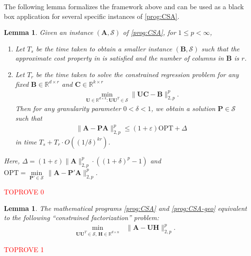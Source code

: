 \documentclass[11pt]{article}
\makeatletter
\theoremstyle{plain}
\newtheorem{lemma}[theorem]{Lemma}
\theoremstyle{plain}
\theoremstyle{definition}
\theoremstyle{plain}
\theoremstyle{remark}
\newenvironment{proof}[1][\protect\proofname]{\par
	\normalfont\topsep6\p@\@plus6\p@\relax
	\trivlist
	\itemindent\parindent
	\item[\hskip\labelsep\scshape #1]\ignorespaces
}{\endtrivlist\@endpefalse
}
\providecommand{\proofname}{Proof}
\newcommand{\RR}{\mathbb{R}}
\newcommand{\cS}{\mathcal{S}}
\newcommand{\opt}{\ensuremath{\text{OPT}}\xspace}
\makeatother
\begin{document}
The following lemma formalizes the framework above and can be used as a black box application for several specific instances of \ref{prog:CSA}.
\begin{lemma}
\label{lem:structural-CSA}
Given an instance $(\bm{A}, \cS)$ of \ref{prog:CSA}, for $1\leq p<\infty$,
\begin{enumerate}
    \item Let $T_s$ be the time taken to obtain a smaller instance $(\bm{B}, \cS)$ such that the approximate cost property in  is satisfied and the number of columns in $\bm{B}$ is $r$.
    \item Let $T_r$ be the time taken to solve the constrained regression problem for any fixed $\bm{B}\in \RR^{d\times r}$ and $\bm{C}\in \RR^{k\times r}$
    \begin{align}
  \label{eqn:constrained_regression}      \min\limits_{\bm{U}\in \RR^{d\times k}: \bm{U}\bm{U}^T\in \cS}\|\bm{U}\bm{C}-\bm{B}\|_{2,p}^p.
    \end{align}
Then for any granularity parameter $0<\delta<1$, we obtain a solution $\bm{P}\in \cS$ such that 
\begin{align}
   \|\bm{A}-\bm{P}\bm{A}\|_{2,p}^p \leq (1+\varepsilon)\opt +\Delta
\end{align}
in time $T_s+T_r\cdot O((1/\delta)^{kr})$.
\end{enumerate}
Here, $\Delta=(1+\varepsilon)\|\bm{A}\|_{2,p}^p\cdot\left((1+\delta)^p-1\right)$ and $\opt=\min\limits_{\bm{P}' \in \cS}\, \|\bm{A}-\bm{P}'\bm{A}\|_{2,p}^p$.
\end{lemma}
\begin{proof}\textcolor{red}{TOPROVE 0}\end{proof}

\begin{lemma}
\label{lem:csa-alt-equiv}
The mathematical programs \ref{prog:CSA} and \ref{prog:CSA-geo} equivalent to the following ``constrained factorization'' problem:
\begin{align}
\label{prog:CSA-factorization}   \min\limits_{\bm{U}\bm{U}^T \in \cS,\, \bm{H}\in \RR^{d\times n}}&\, \|\bm{A}-\bm{U}\bm{H}\|_{2,p}^p. \tag{CSA-fac}
 \end{align}
\end{lemma}
\begin{proof}\textcolor{red}{TOPROVE 1}\end{proof}
\end{document}
